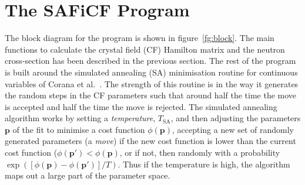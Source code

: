 \documentclass[12pt,onecolumn,tightenlines,aps,amsmath,floatfix,notitlepage,nofootinbib]{revtex4}
\newcommand{\V}[1]{\mathbf{#1}}
\begin{document}




\section{The SAFiCF Program} \label{sec-prog}

The block diagram for the program is shown in figure~\ref{fg:block}. The main functions to calculate the crystal field (CF) Hamilton matrix and the neutron cross-section has been described in the previous section. The rest of the program is built around the simulated annealing (SA) minimisation routine for continuous variables of Corana et al.~\cite{CMMR87}. The strength of this routine is in the way it generates the random steps in the CF parameters such that around half the time the move is accepted and half the time the move is rejected. The simulated annealing algorithm works by setting a \emph{temperature}, $T_\textrm{SA}$, and then adjusting the parameters $\V{p}$ of the fit to minimise a cost function $\phi(\V{p})$, accepting a new set of randomly generated parameters (a \emph{move}) if the new cost function is lower than the current cost function ($\phi(\V{p}')<\phi(\V{p})$, or if not, then randomly with a probability $\exp([\phi(\V{p})-\phi(\V{p}')]/T)$. Thus if the temperature is high, the algorithm maps out a large part of the parameter space.
\end{document}
